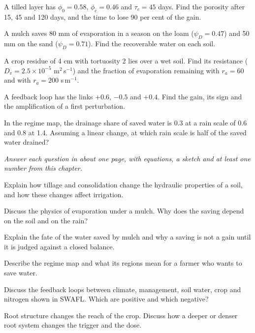\begin{exlist}
\item A tilled layer has $\phi_0=0.58$, $\phi_c=0.46$ and $\tau_c=45$ days. Find the porosity after 15, 45 and 120 days, and the time to lose 90 per cent of the gain.
\item A mulch saves 80 mm of evaporation in a season on the loam ($\psi_D=0.47$) and 50 mm on the sand ($\psi_D=0.71$). Find the recoverable water on each soil.\exans{42.4 mm; 14.5 mm}
\item A crop residue of 4 cm with tortuosity 2 lies over a wet soil. Find its resistance ($D_v=2.5\times10^{-5}$ m$^2$\,s$^{-1}$) and the fraction of evaporation remaining with $r_a=60$ and with $r_a=200$ s\,m$^{-1}$.
\item A feedback loop has the links $+0.6$, $-0.5$ and $+0.4$. Find the gain, its sign and the amplification of a first perturbation.
\item In the regime map, the drainage share of saved water is 0.3 at a rain scale of 0.6 and 0.8 at 1.4. Assuming a linear change, at which rain scale is half of the saved water drained?
\end{exlist}
{\small\itshape Answer each question in about one page, with equations, a sketch and at least one number from this chapter.}\par\vspace{3pt}
\begin{exlist}
\item Explain how tillage and consolidation change the hydraulic properties of a soil, and how these changes affect irrigation.
\item Discuss the physics of evaporation under a mulch. Why does the saving depend on the soil and on the rain?
\item Explain the fate of the water saved by mulch and why a saving is not a gain until it is judged against a closed balance.
\item Describe the regime map and what its regions mean for a farmer who wants to save water.
\item Discuss the feedback loops between climate, management, soil water, crop and nitrogen shown in SWAFL. Which are positive and which negative?
\item Root structure changes the reach of the crop. Discuss how a deeper or denser root system changes the trigger and the dose.
\end{exlist}
